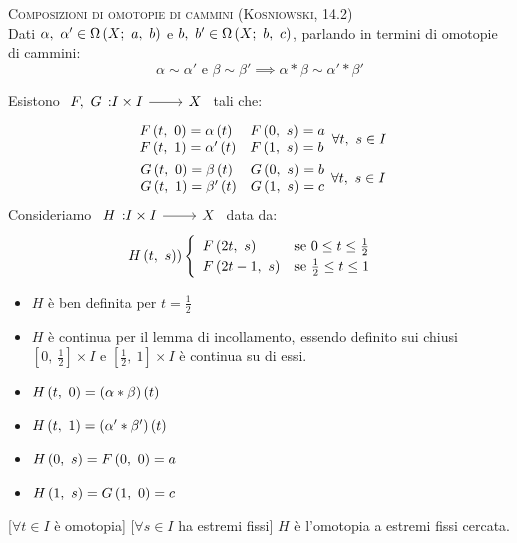 \begin{lemming}\textsc{Composizioni di omotopie di cammini (Kosniowski, 14.2)\label{compoomotopecammini}}\\
	Dati $\alpha,\ \alpha'\in\inscam{X}{a}{b}$ e $b,\ b'\in\inscam{X}{b}{c}$, parlando in termini di omotopie di cammini:
	\begin{equation}
		\alpha\sim \alpha'\text{ e }\beta\sim \beta'\implies \alpha\ast\beta\sim\alpha'\ast\beta'
	\end{equation}
\vspace{-6mm}
\end{lemming}
\begin{demonstration}
	Esistono $\funz{F,\ G}{I\times I}{X}$ tali che:
	\begin{gather*}
		\begin{array}{ll}
			F\left(t,\ 0\right)=\alpha\left(t\right)&F\left(0,\ s\right)=a\\
			F\left(t,\ 1\right)=\alpha'\left(t\right)&F\left(1,\ s\right)=b
		\end{array}
	\forall t,\ s\in I\\
		\begin{array}{ll}
	G\left(t,\ 0\right)=\beta\left(t\right)&G\left(0,\ s\right)=b\\
	G\left(t,\ 1\right)=\beta'\left(t\right)&G\left(1,\ s\right)=c
\end{array}	
	\forall t,\ s\in I
	\end{gather*}
Consideriamo $\funz{H}{I\times I}{X}$ data da:
\begin{equation*}
	H\left(t,\ s\right))\begin{cases}
				\begin{array}{lc}
			F\left(2t,\ s\right) & \text{se }0\leq t\leq \frac{1}{2}\\
			F\left(2t-1,\ s\right) & \text{se }\frac{1}{2}\leq t\leq 1	
		\end{array}
	\end{cases}
\end{equation*}
\begin{itemize}
	\item $H$ è ben definita per $t=\frac{1}{2}$
	\item $H$ è continua per il lemma di incollamento, essendo definito sui chiusi $\left[0,\ \frac{1}{2}\right]\times I$ e $\left[\frac{1}{2},\ 1\right]\times I$ è continua su di essi.
\item \parbox[t]{0.25\textwidth}{$H\left(t,\ 0\right)=\left(\alpha\ast\beta\right)\left(t\right)$}
\item \parbox[t]{0.25\textwidth}{$\mvf{H}{t}{1}=\left(\alpha'\ast\beta'\right)\left(t\right)\ $}
\item \parbox[t]{0.25\textwidth}{$H\left(0,\ s\right)=F\left(0,\ 0\right)=a$}
\item \parbox[t]{0.25\textwidth}{$H\left(1,\ s\right)=G\left(1,\ 0\right)=c$}
\end{itemize}
[$\forall t\in I$ è omotopia]
[$\forall s\in I$ ha estremi fissi]
$H$ è l'omotopia a estremi fissi cercata.
\end{demonstration}
